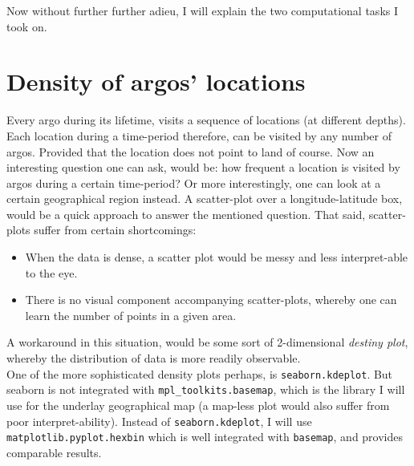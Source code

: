 \documentclass[12pt]{article}
\begin{document}
Now without further further adieu, I will explain the two computational tasks I
took on.

\section{Density of argos' locations}

Every argo during its lifetime, visits a sequence of 
locations (at different depths). Each location during a time-period
therefore, can be visited by any number of argos. Provided that the location
does not point to land of course. Now an interesting question one can ask, would
be: how frequent a location is visited by argos during a certain time-period?
Or more interestingly, one can look at a certain geographical region instead.
A scatter-plot over a longitude-latitude box, would be a quick 
approach to answer the mentioned question. That said, 
scatter-plots suffer from certain shortcomings:

\begin{itemize}
    \item When the data is dense, a scatter plot would be messy and less interpret-able to the eye. 
    \item There is no visual component accompanying scatter-plots, whereby one can learn the number of points in a given area.
\end{itemize}

A workaround in this situation, would be some sort of 2-dimensional 
\textit{destiny plot}, whereby
the distribution of data is more readily observable. \\

One of the more sophisticated density plots perhaps, is 
\verb|seaborn.kdeplot|. 
But seaborn is not integrated with \verb|mpl_toolkits.basemap|,
which is the library I will use for the underlay geographical 
map (a map-less plot would also suffer from poor interpret-ability). 
Instead of \verb|seaborn.kdeplot|, I will use 
\verb|matplotlib.pyplot.hexbin| which
is well integrated with \verb|basemap|, and provides comparable results.\\
\end{document}
